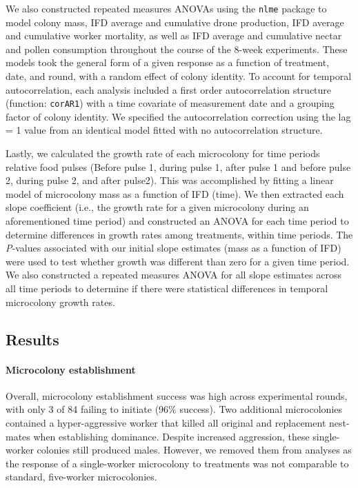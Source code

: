 \documentclass[11pt,]{article}
\let\oldparagraph\paragraph
\renewcommand{\paragraph}[1]{\oldparagraph{#1}\mbox{}}
\begin{document}
We also constructed repeated measures ANOVAs using the \texttt{nlme}
package to model colony mass, IFD average and cumulative drone
production, IFD average and cumulative worker mortality, as well as IFD
average and cumulative nectar and pollen consumption throughout the
course of the 8-week experiments. These models took the general form of
a given response as a function of treatment, date, and round, with a
random effect of colony identity. To account for temporal
autocorrelation, each analysis included a first order autocorrelation
structure (function: \texttt{corAR1}) with a time covariate of
measurement date and a grouping factor of colony identity. We specified
the autocorrelation correction using the lag = 1 value from an identical
model fitted with no autocorrelation structure.

Lastly, we calculated the growth rate of each microcolony for time
periods relative food pulses (Before pulse 1, during pulse 1, after
pulse 1 and before pulse 2, during pulse 2, and after pulse2). This was
accomplished by fitting a linear model of microcolony mass as a function
of IFD (time). We then extracted each slope coefficient (i.e., the
growth rate for a given microcolony during an aforementioned time
period) and constructed an ANOVA for each time period to determine
differences in growth rates among treatments, within time periods. The
\emph{P}-values associated with our initial slope estimates (mass as a
function of IFD) were used to test whether growth was different than
zero for a given time period. We also constructed a repeated measures
ANOVA for all slope estimates across all time periods to determine if
there were statistical differences in temporal microcolony growth rates.

\hypertarget{results}{%
\subsection{Results}\label{results}}

\hypertarget{microcolony-establishment}{%
\paragraph{Microcolony establishment}\label{microcolony-establishment}}

Overall, microcolony establishment success was high across experimental
rounds, with only 3 of 84 failing to initiate (96\% success). Two
additional microcolonies contained a hyper-aggressive worker that killed
all original and replacement nest-mates when establishing dominance.
Despite increased aggression, these single-worker colonies still
produced males. However, we removed them from analyses as the response
of a single-worker microcolony to treatments was not comparable to
standard, five-worker microcolonies.
\end{document}
